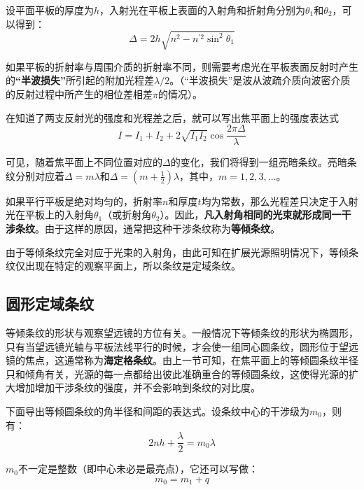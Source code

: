 \documentclass[UTF8]{ctexart}
\begin{document}
	设平面平板的厚度为$ h $，入射光在平板上表面的入射角和折射角分别为$ \theta_{1} $和$ \theta_{2} $，可以得到：
	\begin{equation}
		\Delta= 2 h \sqrt{n^{2}-n^{\prime 2} \sin^{2} \theta_{1}} \label{equ_Delta}
	\end{equation}
	
	如果平板的折射率与周围介质的折射率不同，则需要考虑光在平板表面反射时产生的\textbf{“半波损失”}所引起的附加光程差$ \lambda/2 $。（“半波损失”是波从波疏介质向波密介质的反射过程中所产生的相位差相差$ \pi $的情况）。
	
	在知道了两支反射光的强度和光程差之后，就可以写出焦平面上的强度表达式
	\begin{equation}
		I=I_{1}+I_{2}+2 \sqrt{I_{1} I_{2}} \cos \frac{2 \pi \Delta}{\lambda}
	\end{equation}

\noindent 可见，随着焦平面上不同位置对应的$ \Delta $的变化，我们将得到一组亮暗条纹。亮暗条纹分别对应着$ \Delta= m \lambda $和$ \Delta = (m+\frac{1}{2}) \lambda $，其中，$ m=1,2,3,... $。

	如果平行平板是绝对均匀的，折射率$ n $和厚度$ t $均为常数，那么光程差只决定于入射光在平板上的入射角$ \theta_{1} $（或折射角$ \theta_{2} $）。因此，\textbf{凡入射角相同的光束就形成同一干涉条纹}。由于这样的原因，通常把这种干涉条纹称为\textbf{等倾条纹}。
	
	由于等倾条纹完全对应于光束的入射角，由此可知在扩展光源照明情况下，等倾条纹仅出现在特定的观察平面上，所以条纹是定域条纹。
	
	\subsection{圆形定域条纹}
	等倾条纹的形状与观察望远镜的方位有关。一般情况下等倾条纹的形状为椭圆形，只有当望远镜光轴与平板法线平行的时候，才会使一组同心圆条纹，圆形位于望远镜的焦点，这通常称为\textbf{海定格条纹}。由上一节可知，在焦平面上的等倾圆条纹半径只和倾角有关，光源的每一点都给出彼此准确重合的等倾圆条纹，这使得光源的扩大增加增加干涉条纹的强度，并不会影响到条纹的对比度。
	
	下面导出等倾圆条纹的角半径和间距的表达式。设条纹中心的干涉级为$ m_{0} $，则有：
	\begin{equation}
		2 n h+\frac{\lambda}{2} =m_{0} \lambda
	\end{equation}
	
\noindent $m_{0}$不一定是整数（即中心未必是最亮点），它还可以写做：
\begin{equation}
	m_{0}=m_{1}+q
\end{equation}
\end{document}
